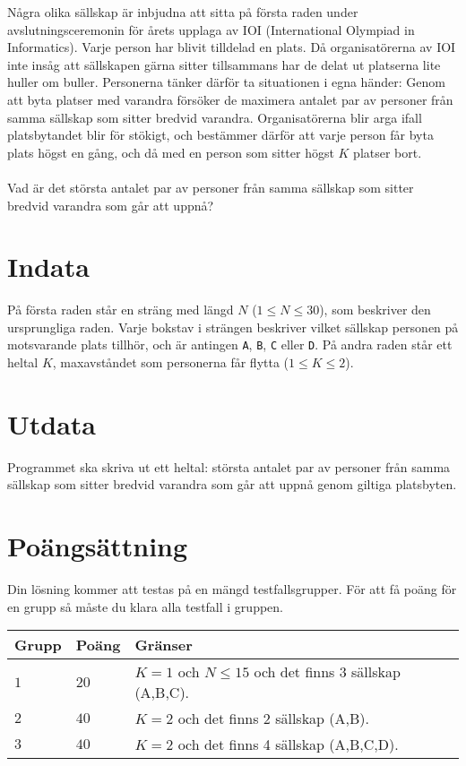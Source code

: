 \noindent

Några olika sällskap är inbjudna att sitta på första raden under avslutningsceremonin för årets upplaga av IOI (International Olympiad in Informatics). Varje person har blivit tilldelad en plats. Då organisatörerna av IOI inte insåg att sällskapen gärna sitter tillsammans har de delat ut platserna lite huller om buller. Personerna tänker därför ta situationen i egna händer: Genom att byta platser med varandra försöker de maximera antalet par av personer från samma sällskap som sitter bredvid varandra. Organisatörerna blir arga ifall platsbytandet blir för stökigt, och bestämmer därför att varje person får byta plats högst en gång, och då med en person som sitter högst $K$ platser bort.\\ \\
Vad är det största antalet par av personer från samma sällskap som sitter bredvid varandra som går att uppnå?

\section*{Indata}
På första raden står en sträng med längd $N$ ($1 \leq N \leq 30$), som beskriver den ursprungliga raden. Varje bokstav i strängen beskriver vilket sällskap personen på motsvarande plats tillhör, och är antingen \texttt{A}, \texttt{B}, \texttt{C} eller \texttt{D}. På andra raden står ett heltal $K$, maxavståndet som personerna får flytta ($1 \leq K \leq 2$). 

\section*{Utdata}
Programmet ska skriva ut ett heltal: största antalet par av personer från samma sällskap som sitter bredvid varandra som går att uppnå genom giltiga platsbyten.

\section*{Poängsättning}
Din lösning kommer att testas på en mängd testfallsgrupper.
För att få poäng för en grupp så måste du klara alla testfall i gruppen.

\noindent
\begin{tabular}{| l | l | p{12cm} |}
  \hline
  \textbf{Grupp} & \textbf{Poäng} & \textbf{Gränser} \\ \hline
  $1$    & $20$       & $K=1$ och $N \leq 15$ och det finns 3 sällskap (A,B,C). \\ \hline
  $2$    & $40$       & $K=2$ och det finns 2 sällskap (A,B). \\ \hline
  $3$    & $40$       & $K=2$ och det finns 4 sällskap (A,B,C,D). \\ \hline
\end{tabular}

